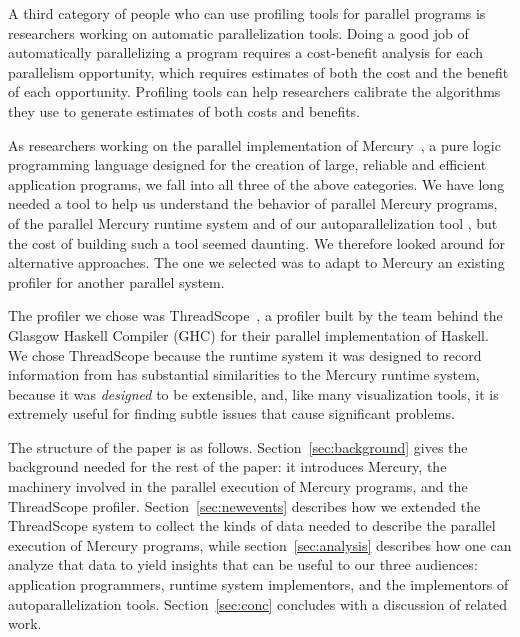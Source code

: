 A third category of people who can use profiling tools for parallel programs
is researchers working on automatic parallelization tools.
Doing a good job of automatically parallelizing a program
requires a cost-benefit analysis for each parallelism opportunity,
which requires estimates of both the cost and the benefit of each opportunity.
Profiling tools can help researchers calibrate
the algorithms they use to generate estimates of both costs and benefits.

As researchers working on the parallel implementation of Mercury~\cite{jlp},
a pure logic programming language designed for
the creation of large, reliable and efficient application programs,
we fall into all three of the above categories.
We have long needed a tool
to help us understand the behavior of parallel Mercury programs,
of the parallel Mercury runtime system
and of our autoparallelization tool \cite{overlap},
but the cost of building such a tool seemed daunting.
We therefore looked around for alternative approaches.
The one we selected was to adapt to Mercury
an existing profiler for another parallel system.

The profiler we chose was ThreadScope~\cite{threadscope},
a profiler built by the team behind the Glasgow Haskell Compiler (GHC)
for their parallel implementation of Haskell.
We chose ThreadScope because
the runtime system it was designed to record information from
has substantial similarities to the Mercury runtime system,
because it was \emph{designed} to be extensible,
and, like many visualization tools, it is extremely useful
for finding subtle issues that cause significant problems.


The structure of the paper is as follows.
Section~\ref{sec:background} gives the background
needed for the rest of the paper:
it introduces Mercury,
the machinery involved in the parallel execution of Mercury programs,
and the ThreadScope profiler.
Section~\ref{sec:newevents}
describes how we extended the ThreadScope system
to collect the kinds of data needed to describe
the parallel execution of Mercury programs,
while section~\ref{sec:analysis} describes how
one can analyze that data to yield insights
that can be useful to our three audiences:
application programmers,
runtime system implementors,
and the implementors of autoparallelization tools.
Section~\ref{sec:conc}
concludes with a discussion of related work.

